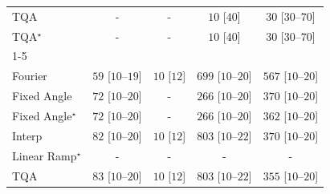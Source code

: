 \begin{tabular}{l|cccc|}
TQA & {\cellcolor[HTML]{000000}} \color[HTML]{F1F1F1} {\cellcolor{white}} \color{black} - & {\cellcolor[HTML]{000000}} \color[HTML]{F1F1F1} {\cellcolor{white}} \color{black} - & {\cellcolor[HTML]{F7FCF5}} \color[HTML]{000000} $10$ [$40$] & {\cellcolor[HTML]{F4FBF1}} \color[HTML]{000000} $30$ [$30$--$70$] \\
TQA$^\star$ & {\cellcolor[HTML]{000000}} \color[HTML]{F1F1F1} {\cellcolor{white}} \color{black} - & {\cellcolor[HTML]{000000}} \color[HTML]{F1F1F1} {\cellcolor{white}} \color{black} - & {\cellcolor[HTML]{F7FCF5}} \color[HTML]{000000} $10$ [$40$] & {\cellcolor[HTML]{F4FBF1}} \color[HTML]{000000} $30$ [$30$--$70$] \\
\cline{1-5}
\multicolumn{5}{c}{\rule{0pt}{8pt}SV} \\
\midrule
Fourier & {\cellcolor[HTML]{EFF9EB}} \color[HTML]{000000} $59$ [$10$--$19$] & {\cellcolor[HTML]{F7FCF5}} \color[HTML]{000000} $10$ [$12$] & {\cellcolor[HTML]{016E2D}} \color[HTML]{F1F1F1} $699$ [$10$--$20$] & {\cellcolor[HTML]{2F974E}} \color[HTML]{F1F1F1} $567$ [$10$--$20$] \\
Fixed Angle & {\cellcolor[HTML]{ECF8E8}} \color[HTML]{000000} $72$ [$10$--$20$] & {\cellcolor[HTML]{000000}} \color[HTML]{F1F1F1} {\cellcolor{white}} \color{black} - & {\cellcolor[HTML]{B1E0AB}} \color[HTML]{000000} $266$ [$10$--$20$] & {\cellcolor[HTML]{84CC83}} \color[HTML]{000000} $370$ [$10$--$20$] \\
Fixed Angle$^\star$ & {\cellcolor[HTML]{ECF8E8}} \color[HTML]{000000} $72$ [$10$--$20$] & {\cellcolor[HTML]{000000}} \color[HTML]{F1F1F1} {\cellcolor{white}} \color{black} - & {\cellcolor[HTML]{B1E0AB}} \color[HTML]{000000} $266$ [$10$--$20$] & {\cellcolor[HTML]{88CE87}} \color[HTML]{000000} $362$ [$10$--$20$] \\
Interp & {\cellcolor[HTML]{EAF7E6}} \color[HTML]{000000} $82$ [$10$--$20$] & {\cellcolor[HTML]{F7FCF5}} \color[HTML]{000000} $10$ [$12$] & {\cellcolor[HTML]{00441B}} \color[HTML]{F1F1F1} $803$ [$10$--$22$] & {\cellcolor[HTML]{84CC83}} \color[HTML]{000000} $370$ [$10$--$20$] \\
Linear Ramp$^\star$ & {\cellcolor[HTML]{000000}} \color[HTML]{F1F1F1} {\cellcolor{white}} \color{black} - & {\cellcolor[HTML]{000000}} \color[HTML]{F1F1F1} {\cellcolor{white}} \color{black} - & {\cellcolor[HTML]{000000}} \color[HTML]{F1F1F1} {\cellcolor{white}} \color{black} - & {\cellcolor[HTML]{000000}} \color[HTML]{F1F1F1} {\cellcolor{white}} \color{black} - \\
TQA & {\cellcolor[HTML]{EAF7E6}} \color[HTML]{000000} $83$ [$10$--$20$] & {\cellcolor[HTML]{F7FCF5}} \color[HTML]{000000} $10$ [$12$] & {\cellcolor[HTML]{00441B}} \color[HTML]{F1F1F1} $803$ [$10$--$22$] & {\cellcolor[HTML]{8BCF89}} \color[HTML]{000000} $355$ [$10$--$20$] \\

\end{tabular}
